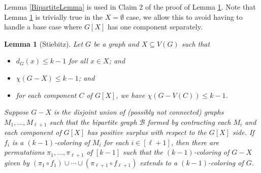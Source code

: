 \documentclass[12pt]{article}
\theoremstyle{plain}
\newtheorem{lem}[thm]{Lemma}
\theoremstyle{definition}
\theoremstyle{remark}
\newcommand{\fancy}[1]{\mathcal{#1}}
\newcommand{\B}{\fancy{B}}
\newcommand{\irange}[1]{\left[#1\right]}
\begin{document}
Lemma \ref{BipartiteLemma} is used in Claim 2 of the proof of Lemma \ref{WithPositiveSurplus}. Note that Lemma \ref{WithPositiveSurplus} is trivially true in the $X = \emptyset$ case, we allow this to avoid having to handle a base case where $G[X]$ has one component separately.
\begin{lem}[Stiebitz]
Let $G$ be a graph and $X \subseteq V(G)$ such that
\begin{itemize}
\item $d_G(x) \le k - 1$ for all $x \in X$; and
\item $\chi(G-X) \le k-1$; and
\item for each component $C$ of $G[X]$, we have $\chi(G - V(C)) \le k - 1$.
\end{itemize}
Suppose $G-X$ is the disjoint union of (possibly not connected) graphs $M_1, \ldots, M_{\ell + 1}$ such that the bipartite graph $\B$ formed by contracting each $M_i$ and each component of $G[X]$ has positive surplus with respect to the $G[X]$ side.  If $f_i$ is a $(k-1)$-coloring of $M_i$ for each $i \in \irange{\ell + 1}$, then there are permutations $\pi_1, \ldots, \pi_{\ell + 1}$ of $\irange{k-1}$ such that the $(k-1)$-coloring of $G-X$ given by $(\pi_1 \circ f_1) \cup \cdots \cup (\pi_{\ell + 1} \circ f_{\ell + 1})$ extends to a $(k - 1)$-coloring of $G$.
\label{WithPositiveSurplus}
\end{lem}
\end{document}
